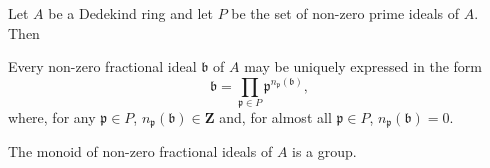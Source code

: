 \begin{theorem}
\label{thm:III.4.3}
Let $A$ be a Dedekind ring and let $P$ be the set of non-zero prime ideals
of $A$. Then
\begin{alist}
\item Every non-zero fractional ideal $\mathfrak{b}$ of $A$ may be uniquely
expressed in the form
\begin{equation}
\mathfrak{b}=\prod_{\mathfrak{p}\in P}
\mathfrak{p}^{n_{\mathfrak{p}}(\mathfrak{b})},
\label{eq:III.4.4}
\end{equation}
where, for any $\mathfrak{p}\in P$,
$n_{\mathfrak{p}}(\mathfrak{b})\in\mathbf{Z}$ and, for almost all
$\mathfrak{p}\in P$, $n_{\mathfrak{p}}(\mathfrak{b})=0$.
\item The monoid of non-zero fractional ideals of $A$ is a group.
\end{alist}
\end{theorem}

